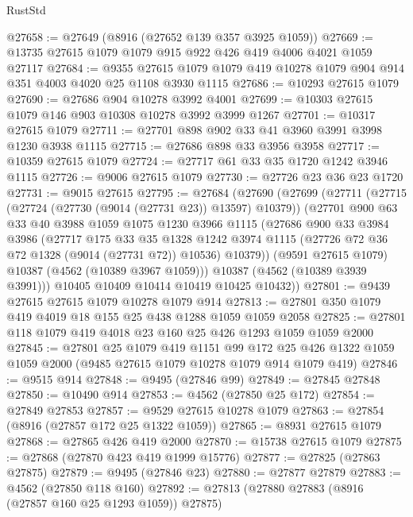 \begin{lexlean}{RustStd}
\begin{coremodule}
@27658 := @27649 (@8916 (@27652 @139 @357 @3925 @1059))
@27669 := @13735 @27615 @1079 @1079 @915 @922 @426 @419 @4006 @4021 @1059 @27117
@27684 := @9355
    @27615
    @1079
    @1079
    @419
    @10278
    @1079
    @904
    @914
    @351
    @4003
    @4020
    @25
    @1108
    @3930
    @1115
@27686 := @10293 @27615 @1079
@27690 := @27686 @904 @10278 @3992 @4001
@27699 := @10303 @27615 @1079 @146 @903 @10308 @10278 @3992 @3999 @1267
@27701 := @10317 @27615 @1079
@27711 := @27701 @898 @902 @33 @41 @3960 @3991 @3998 @1230 @3938 @1115
@27715 := @27686 @898 @33 @3956 @3958
@27717 := @10359 @27615 @1079
@27724 := @27717 @61 @33 @35 @1720 @1242 @3946 @1115
@27726 := @9006 @27615 @1079
@27730 := @27726 @23 @36 @23 @1720
@27731 := @9015 @27615
@27795 := @27684
    (@27690
      (@27699
        (@27711
          (@27715 (@27724 (@27730 (@9014 (@27731 @23)) @13597) @10379))
          (@27701
            @900
            @63
            @33
            @40
            @3988
            @1059
            @1075
            @1230
            @3966
            @1115
            (@27686
              @900
              @33
              @3984
              @3986
              (@27717
                @175
                @33
                @35
                @1328
                @1242
                @3974
                @1115
                (@27726 @72 @36 @72 @1328 (@9014 (@27731 @72)) @10536)
                @10379))
            (@9591 @27615 @1079)
            @10387
            (@4562 (@10389 @3967 @1059)))
          @10387
          (@4562 (@10389 @3939 @3991)))
        @10405
        @10409
        @10414
        @10419
        @10425
        @10432))
@27801 := @9439 @27615 @27615 @1079 @10278 @1079 @914
@27813 := @27801 @350 @1079 @419 @4019 @18 @155 @25 @438 @1288 @1059 @1059 @2058
@27825 := @27801 @118 @1079 @419 @4018 @23 @160 @25 @426 @1293 @1059 @1059 @2000
@27845 := @27801
    @25
    @1079
    @419
    @1151
    @99
    @172
    @25
    @426
    @1322
    @1059
    @1059
    @2000
    (@9485 @27615 @1079 @10278 @1079 @914 @1079 @419)
@27846 := @9515 @914
@27848 := @9495 (@27846 @99)
@27849 := @27845 @27848
@27850 := @10490 @914
@27853 := @4562 (@27850 @25 @172)
@27854 := @27849 @27853
@27857 := @9529 @27615 @10278 @1079
@27863 := @27854 (@8916 (@27857 @172 @25 @1322 @1059))
@27865 := @8931 @27615 @1079
@27868 := @27865 @426 @419 @2000
@27870 := @15738 @27615 @1079
@27875 := @27868 (@27870 @423 @419 @1999 @15776)
@27877 := @27825 (@27863 @27875)
@27879 := @9495 (@27846 @23)
@27880 := @27877 @27879
@27883 := @4562 (@27850 @118 @160)
@27892 := @27813 (@27880 @27883 (@8916 (@27857 @160 @25 @1293 @1059)) @27875)

\end{coremodule}
\end{lexlean}

